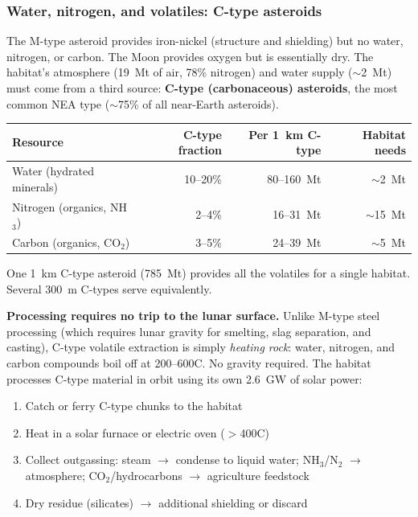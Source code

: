 \documentclass[12pt,letterpaper]{article}
\begin{document}
\subsubsection{Water, nitrogen, and volatiles: C-type asteroids}

The M-type asteroid provides iron-nickel (structure and shielding) but no water, nitrogen, or carbon. The Moon provides oxygen but is essentially dry. The habitat's atmosphere (19~Mt of air, 78\% nitrogen) and water supply ($\sim$2~Mt) must come from a third source: \textbf{C-type (carbonaceous) asteroids}, the most common NEA type ($\sim$75\% of all near-Earth asteroids).

\begin{center}
\small
\begin{tabular}{lrrr}
\toprule
\textbf{Resource} & \textbf{C-type fraction} & \textbf{Per 1~km C-type} & \textbf{Habitat needs} \\
\midrule
Water (hydrated minerals) & 10--20\% & 80--160~Mt & $\sim$2~Mt \\
Nitrogen (organics, NH$_3$) & 2--4\% & 16--31~Mt & $\sim$15~Mt \\
Carbon (organics, CO$_2$) & 3--5\% & 24--39~Mt & $\sim$5~Mt \\
\bottomrule
\end{tabular}
\end{center}

One 1~km C-type asteroid (785~Mt) provides all the volatiles for a single habitat. Several 300~m C-types serve equivalently.

\textbf{Processing requires no trip to the lunar surface.} Unlike M-type steel processing (which requires lunar gravity for smelting, slag separation, and casting), C-type volatile extraction is simply \emph{heating rock}: water, nitrogen, and carbon compounds boil off at 200--600\textdegree C. No gravity required. The habitat processes C-type material in orbit using its own 2.6~GW of solar power:

\begin{enumerate}[label=(\roman*)]
\item Catch or ferry C-type chunks to the habitat
\item Heat in a solar furnace or electric oven ($>$400\textdegree C)
\item Collect outgassing: steam $\to$ condense to liquid water; NH$_3$/N$_2$ $\to$ atmosphere; CO$_2$/hydrocarbons $\to$ agriculture feedstock
\item Dry residue (silicates) $\to$ additional shielding or discard
\end{enumerate}
\end{document}
